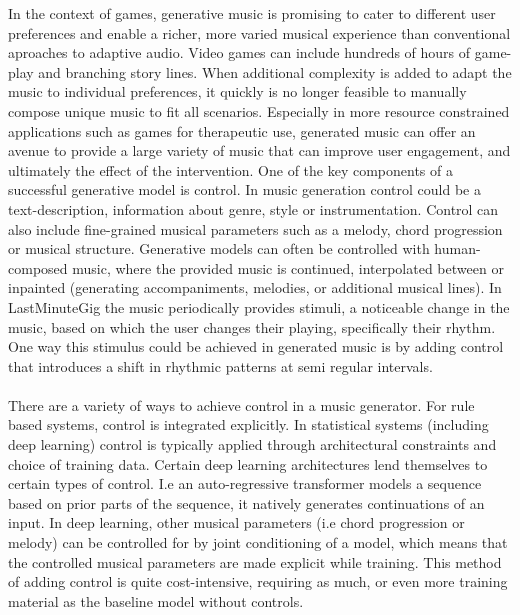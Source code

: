 In the context of games, generative music is promising to cater to different user preferences and enable a richer, more varied musical experience than conventional aproaches to adaptive audio. Video games can include hundreds of hours of game-play and branching story lines. When additional complexity is added to adapt the music to individual preferences, it quickly is no longer feasible to manually compose unique music to fit all scenarios. Especially in more resource constrained applications such as games for therapeutic use, generated music can offer an avenue to provide a large variety of music that can improve user engagement, and ultimately the effect of the intervention.
One of the key components of a successful generative model is control. In music generation control could be a text-description, information about genre, style or instrumentation. Control can also include fine-grained musical parameters such as a melody, chord progression or musical structure. Generative models can often be controlled with human-composed music, where the provided music is continued, interpolated between or inpainted (generating accompaniments, melodies, or additional musical lines). In LastMinuteGig\cite{Chalkiadakis_2022} the music periodically provides stimuli, a noticeable change in the music, based on which the user changes their playing, specifically their rhythm. One way this stimulus could be achieved in generated music is by adding control that introduces a shift in rhythmic patterns at semi regular intervals. \\\\
There are a variety of ways to achieve control in a music generator. For rule based systems, control is integrated explicitly. In statistical systems (including deep learning) control is typically applied through architectural constraints and choice of training data. Certain deep learning architectures lend themselves to certain types of control. I.e an auto-regressive transformer models a sequence based on prior parts of the sequence, it natively generates continuations of an input. In deep learning, other musical parameters (i.e chord progression or melody) can be controlled for  by joint conditioning of a model, which means that the controlled musical parameters are made explicit while training. This method of adding control is quite cost-intensive, requiring as much, or even more training material as the baseline model without controls. \\\\
